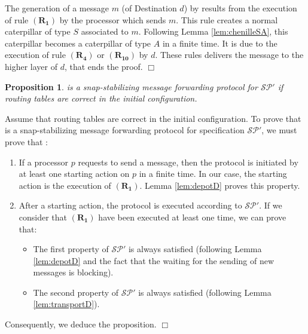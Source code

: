 \documentclass[11pt]{article}
\newtheorem{proposition}{Proposition}
\newenvironment{proof}{{\noindent\bf Proof. } }{{\hfill $\Box$}}
\begin{document}
\begin{proof}
The generation of a message $m$ (of Destination $d$) by \AD results from the execution of rule $\boldsymbol{(R_{1})}$ by the processor which sends $m$. This rule creates a normal caterpillar of type $S$ associated to $m$. Following Lemma \ref{lem:chenilleSA}, this caterpillar becomes a caterpillar of type $A$ in a finite time. It is due to the execution of rule $\boldsymbol{(R_{4})}$ or $\boldsymbol{(R_{10})}$ by $d$. These rules delivers the message to the higher layer of $d$, that ends the proof.
\end{proof}

\begin{proposition} \label{prop:snapTRD}
\AD is a snap-stabilizing message forwarding protocol for $\mathcal{SP}'$ if routing tables are correct in the initial configuration.
\end{proposition}

\begin{proof}
Assume that routing tables are correct in the initial configuration. To prove that \AD is a snap-stabilizing message forwarding protocol for specification $\mathcal{SP}'$, we must prove that :

\begin{enumerate}
\item If a processor $p$ requests to send a message, then the protocol is initiated by at least one starting action on $p$ in a finite time. In our case, the starting action is the execution of $\boldsymbol{(R_{1})}$. Lemma \ref{lem:depotD} proves this property. 
\item After a starting action, the protocol is executed according to $\mathcal{SP}'$. If we consider that $\boldsymbol{(R_{1})}$ have been executed at least one time, we can prove that:

\begin{itemize}
\item The first property of $\mathcal{SP}'$ is always satisfied (following Lemma \ref{lem:depotD} and the fact that the waiting for the sending of new messages is blocking). 
\item The second property of $\mathcal{SP}'$ is always satisfied (following Lemma \ref{lem:transportD}). 
\end{itemize}

\end{enumerate}

Consequently, we deduce the proposition.
\end{proof}
\end{document}
